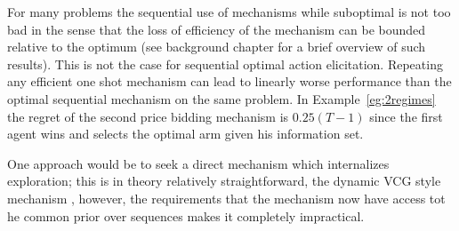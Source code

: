 
For many problems the sequential use of mechanisms while suboptimal is not too bad in the sense that the loss of efficiency of the mechanism can be bounded relative to the optimum (see background chapter for a brief overview of such results).
This is not the case for sequential optimal action elicitation. Repeating any efficient one shot mechanism can lead to linearly worse performance than the optimal sequential mechanism on the same problem. In Example~\ref{eg:2regimes} the regret of the  second price bidding mechanism is $0.25(T-1)$ since the first agent wins and selects the optimal arm given his information set.










One approach would be to seek a direct mechanism which internalizes exploration; this is in theory relatively straightforward, the dynamic VCG style mechanism , however, the requirements that the mechanism now have access tot he common prior over sequences makes it completely impractical.




